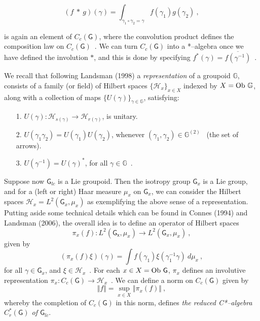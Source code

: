 \documentclass[12pt]{article}
\theoremstyle{plain}
\theoremstyle{definition}
\numberwithin{equation}{section}
\newcommand{\grp}{{\mathbb G}}
\newcommand{\ob}{{\rm Ob}}
\newcommand{\lra}{{\longrightarrow}}
\begin{document}
\begin{equation} (f ~*~g)(\gamma)
= \int_{\gamma_1 \circ \gamma_2 = \gamma} f(\gamma_1) g
(\gamma_2)~,
\end{equation}

is again an element of $C_c(\mathsf{G})$, where the convolution product
defines the composition law on $C_c(\mathsf{G})$~. We can turn
$C_c(\mathsf{G})$ into a *--algebra once we have defined the involution
$*$, and this is done by specifying $f^*(\gamma) = \overline{f(\gamma^{-1})}$~.

We recall that following Landsman (1998) a \emph{representation} of a groupoid $\grp$, consists of a
family (or field) of Hilbert spaces $\{\mathcal H_x \}_{x \in X}$
indexed by $X = \ob~ \grp$, along with a collection of maps $\{
U(\gamma)\}_{\gamma \in \grp}$, satisfying:
\begin{itemize}
\item[1.]
$U(\gamma) : \mathcal H_{s(\gamma)} \lra \mathcal H_{r(\gamma)}$,
is unitary.
\item[2.]
$U(\gamma_1 \gamma_2) = U(\gamma_1) U( \gamma_2)$, whenever
$(\gamma_1, \gamma_2) \in \grp^{(2)}$~ (the set of arrows).


\item[3.]
$U(\gamma^{-1}) = U(\gamma)^*$, for all $\gamma \in \grp$~.
\end{itemize}

Suppose now $\mathsf{G}_{lc}$ is a Lie groupoid. Then the isotropy group
$\mathsf{G}_x$ is a Lie group, and for a (left or right) Haar
measure $\mu_x$ on $\mathsf{G}_x$, we can consider the Hilbert
spaces $\mathcal H_x = L^2(\mathsf{G}_x, \mu_x)$ as exemplifying the
above sense of a representation. Putting aside some technical
details which can be found in Connes (1994) and Landsman (2006), the
overall idea is to define an operator of Hilbert spaces
\begin{equation}\pi_x(f) : L^2(\mathsf{G_x},\mu_x) \lra L^2(\mathsf{G}_x, \mu_x)~,
\end{equation}
given by
\begin{equation}
(\pi_x(f) \xi)(\gamma) = \int f(\gamma_1) \xi (\gamma_1^{-1}
\gamma)~ d\mu_x~,
\end{equation}
for all $\gamma \in \mathsf{G}_x$, and
$\xi \in \mathcal H_x$~. For each $x \in X =\ob ~\mathsf{G}$, $\pi_x$
defines an involutive representation $\pi_x : C_c(\mathsf{G}) \lra
\mathcal H_x$~. We can define a norm on $C_c(\mathsf{G})$ given by
\begin{equation}
\Vert f \Vert = \sup_{x \in X} \Vert \pi_x(f) \Vert~,
\end{equation}
whereby the completion of $C_c(\mathsf{G})$ in this norm, defines
\emph{the reduced C*--algebra $C^*_r(\mathsf{G})$ of $\mathsf{G}_{lc}$}.
\end{document}
